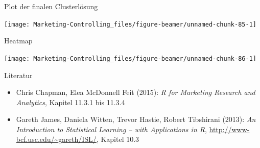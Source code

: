 \documentclass[12pt,ngerman,a4paper,ignorenonframetext,]{beamer}
\newenvironment{Shaded}{\begin{snugshade}}{\end{snugshade}}
\newcommand{\DataTypeTok}[1]{\textcolor[rgb]{0.13,0.29,0.53}{#1}}
\newcommand{\DecValTok}[1]{\textcolor[rgb]{0.00,0.00,0.81}{#1}}
\newcommand{\FloatTok}[1]{\textcolor[rgb]{0.00,0.00,0.81}{#1}}
\newcommand{\KeywordTok}[1]{\textcolor[rgb]{0.13,0.29,0.53}{\textbf{#1}}}
\newcommand{\NormalTok}[1]{#1}
\newcommand{\OperatorTok}[1]{\textcolor[rgb]{0.81,0.36,0.00}{\textbf{#1}}}
\newcommand{\OtherTok}[1]{\textcolor[rgb]{0.56,0.35,0.01}{#1}}
\newcommand{\StringTok}[1]{\textcolor[rgb]{0.31,0.60,0.02}{#1}}
\providecommand{\tightlist}{%
  \setlength{\itemsep}{0pt}\setlength{\parskip}{0pt}}
\begin{document}
\begin{frame}{Plot der finalen Clusterlösung}
\protect\hypertarget{plot-der-finalen-clusterlosung}{}

\begin{Shaded}
\end{Shaded}

\begin{center}\texttt{[image: Marketing-Controlling\_files/figure-beamer/unnamed-chunk-85-1]} \end{center}

\end{frame}

\begin{frame}{Heatmap}
\protect\hypertarget{heatmap}{}

\begin{Shaded}
\end{Shaded}

\begin{center}\texttt{[image: Marketing-Controlling\_files/figure-beamer/unnamed-chunk-86-1]} \end{center}

\end{frame}

\begin{frame}{Literatur}
\protect\hypertarget{literatur-3}{}

\begin{itemize}
\tightlist
\item
  Chris Chapman, Elea McDonnell Feit (2015): \emph{R for Marketing
  Research and Analytics}, Kapitel 11.3.1 bis 11.3.4
\item
  Gareth James, Daniela Witten, Trevor Hastie, Robert Tibshirani (2013):
  \emph{An Introduction to Statistical Learning -- with Applications in
  R}, \url{http://www-bcf.usc.edu/~gareth/ISL/}, Kapitel 10.3
\end{itemize}

\end{frame}
\end{document}
